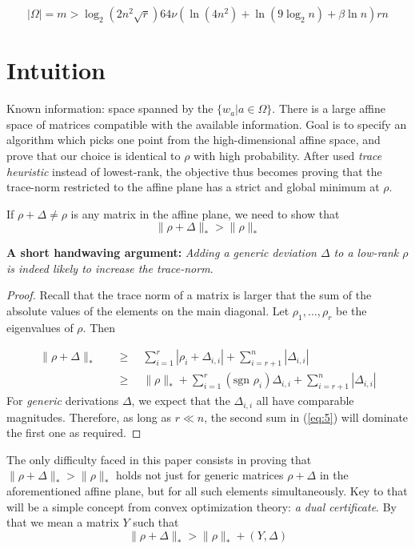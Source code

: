 \documentclass{article}
\begin{document}
\[
|\Omega|=m > \log_2(2n^2\sqrt{r}) 64\nu(\ln(4n^2)+\ln(9\log_2n)+\beta\ln n) rn
\]

\section{Intuition}
Known information: space spanned by the $\lbrace w_a | a \in \Omega\rbrace$. There is a large affine space of matrices compatible with the available information. Goal is to specify an algorithm which picks one point from the high-dimensional affine space, and prove that our choice is identical to $\rho$ with high probability. After used \textit{trace heuristic} instead of lowest-rank, the objective thus becomes proving that the trace-norm restricted to the affine plane has a strict and global minimum at $\rho$. 

If $\rho + \Delta \neq \rho$ is any matrix in the affine plane, we need to show that 
\begin{equation}
\|\rho + \Delta\|_* > \|\rho\|_*
\label{eq:4}
\end{equation}

\textbf{A short handwaving argument: }\textit{Adding a generic deviation $\Delta$ to a low-rank $\rho$ is indeed likely to increase the trace-norm.}
\begin{proof}
{\color{red}Recall that the trace norm of a matrix is larger that the sum of the absolute values of the elements on the main diagonal.} Let $\rho_1, \dots, \rho_r$ be the eigenvalues of $\rho$. Then

\begin{equation}
\begin{aligned}
\|\rho + \Delta\|_* \quad
&  \ge \quad \sum_{i=1}^r|\rho_i + \Delta_{i,i}| + \sum_{i = r+1}^n|\Delta_{i,i}|\\
&  \ge  \quad \|\rho\|_* + \sum_{i=1}^r (\text{sgn }\rho_i)\Delta_{i,i} + \sum_{i = r+1}^n |\Delta_{i,i}|
\end{aligned}
\label{eq:5}
\end{equation}
For \textit{generic} derivations $\Delta$, we expect that the $\Delta_{i,i}$ all have comparable magnitudes. Therefore, as long as $r\ll n$, the second sum in (\ref{eq:5}) will dominate the first one as required.
\end{proof}


The only {\color{blue}difficulty faced in this paper consists in proving that $\|\rho + \Delta\|_* > \|\rho\|_*$ holds not just for generic matrices $\rho + \Delta$ in the aforementioned affine plane, but for {\color{red}all such elements} simultaneously.} Key to that will be a simple concept from convex optimization theory:{ \color{red}\textit{a dual certificate}}. By that we mean a matrix $Y$ such that 
\begin{equation}
\|\rho + \Delta\|_* > \|\rho\|_* + (Y, \Delta)
\end{equation}
\end{document}
